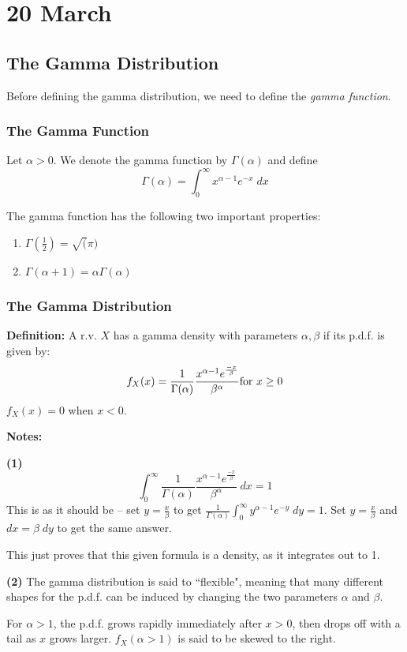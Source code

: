 \documentclass[12pt]{article}
\begin{document}
\section{20 March}
\subsection{The Gamma Distribution}
Before defining the gamma distribution, we need to define the \emph{gamma function}.

\subsubsection{The Gamma Function}
Let $\alpha> 0$. We denote the gamma function by $\Gamma (\alpha)$ and define
\[
    \Gamma(\alpha) = \int_0^{\infty} x^{\alpha - 1} e^{-x} \; dx
\]

The gamma function has the following two important properties:
\begin{enumerate}
    \item $\Gamma (\frac{1}{2}) = \sqrt(\pi)$
    \item $\Gamma(\alpha + 1) = \alpha \Gamma(\alpha)$
\end{enumerate}

\subsubsection{The Gamma Distribution}
\textbf{Definition:} A r.v. $X$ has a gamma density with parameters $\alpha, \beta$ if its p.d.f. is given by:
\[
    f_X (x) = \frac{1}{\Gamma(\alpha)} \frac{x^{\alpha -1} e^{\frac{-x}{\beta}}}{\beta^{\alpha}} \textnormal{for $x \geq 0$}
\]  
$f_X (x) = 0$ when $x < 0$.

        \textbf{Notes:}

\textbf{(1)} 
\[
    \int_0^{\infty} \frac{1}{\Gamma(\alpha)} \frac{x^{\alpha -1}e^{\frac{-x}{\beta}}}{\beta^{\alpha}} \; dx = 1
\]
This is as it should be -- set $y = \frac{x}{\beta}$ to get $\frac{1}{\Gamma(\alpha)} \int_0^{\infty} y^{\alpha -1}e^{-y} \; dy = 1$. Set $y=\frac{x}{\beta}$ and $dx = \beta \; dy$ to get the same answer.

This just proves that this given formula is a density, as it integrates out to 1.

\textbf{(2)}
The gamma distribution is said to ``flexible", meaning that many different shapes for the p.d.f. can be induced by changing the two parameters $\alpha$ and $\beta$.

For $\alpha > 1$, the p.d.f. grows rapidly immediately after $x > 0$, then drops off with a tail as $x$ grows larger. $f_X (\alpha > 1)$ is said to be skewed to the right.
\end{document}
